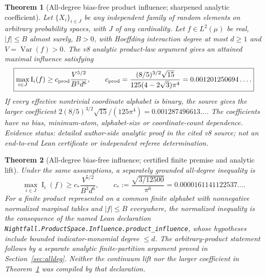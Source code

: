 \documentclass[11pt,letterpaper]{article}
\newtheorem{theorem}{Theorem}[section]
\theoremstyle{definition}\newtheorem{definition}[theorem]{Definition}
\newcommand{\Var}{\operatorname{Var}}
\newcommand{\Inf}{\operatorname{I}}
\newcommand{\cprod}{c_{\rm prod}}
\begin{document}
\begin{theorem}[All-degree bias-free product influence; sharpened analytic coefficient]\label{thm:alldeg}
Let $\{X_i\}_{i\in J}$ be any independent family of random elements on arbitrary probability spaces, with $J$ of any cardinality. Let $f\in L^2(\mu)$ be real, $|f|\le B$ almost surely, $B>0$, with Hoeffding interaction degree at most $d\ge1$ and $V=\Var(f)>0$. The v8 analytic product-law argument gives an attained maximal influence satisfying
\begin{equation}\label{eq:alldegheadline}
\boxed{\displaystyle \max_{i\in J}\Inf_i(f)\ge
 \cprod\frac{V^{5/2}}{B^3d^6},\qquad
 \cprod=\frac{(8/5)^{3/2}\sqrt{15}}{125(4-2\sqrt3)\pi^4}
 =0.001201250694\ldots.}
\end{equation}
If every effective nontrivial coordinate alphabet is binary, the source gives the larger coefficient
$2(8/5)^{3/2}\sqrt{15}/(125\pi^4)=0.001287496613\ldots$.
The coefficients have no bias, minimum-atom, alphabet-size or coordinate-count dependence. \emph{Evidence status:} detailed author-side analytic proof in the cited v8 source; not an end-to-end Lean certificate or independent referee determination.
\end{theorem}

\begin{theorem}[All-degree bias-free influence; certified finite premise and analytic lift]\label{thm:lean}
Under the same assumptions, a separately grounded all-degree inequality is
\begin{equation}\label{eq:lean}
\boxed{\displaystyle \max_{i\in J}\Inf_i(f)\ge c_*\frac{V^{5/2}}{B^3d^6},\qquad
 c_*:=\frac{\sqrt{3/12500}}{\pi^6}=0.0000161141122537\ldots.}
\end{equation}
For a finite product represented on a common finite alphabet with nonnegative normalized marginal tables and $|f|\le B$ everywhere, the normalized inequality is the consequence of the named Lean declaration 
\texttt{Nightfall.ProductSpace.Influence.product\_influence}, whose hypotheses include bounded indicator-monomial degree $\le d$. The arbitrary-product statement follows by a separate analytic finite-partition argument proved in Section~\ref{sec:alldeg}. Neither the continuum lift nor the larger coefficient in Theorem~\ref{thm:alldeg} was compiled by that declaration.
\end{theorem}
\end{document}
